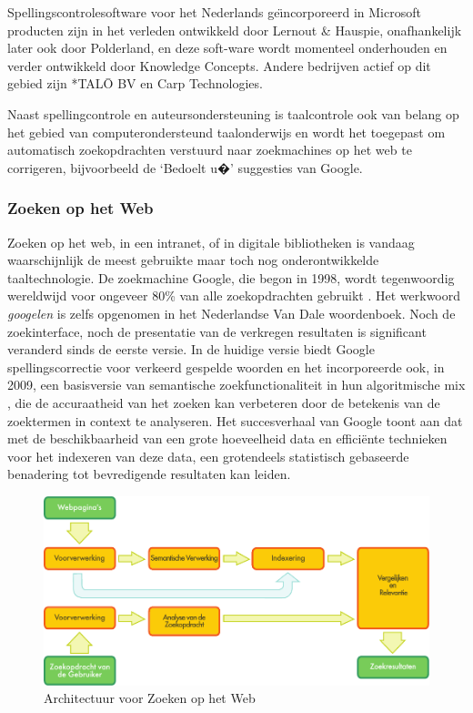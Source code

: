 \documentclass[]{../../metanetpaper}
\begin{document}
\begin{multicols}{2}
    Spellingscontrolesoftware voor het Nederlands ge{\"\i}ncorporeerd in Microsoft producten zijn in het verleden ontwikkeld door Lernout \& Hauspie, onafhankelijk later ook door Polderland, en deze soft-ware wordt momenteel onderhouden en verder ontwikkeld door Knowledge Concepts. Andere bedrijven actief op dit gebied zijn *TAL{\=O} BV en Carp Technologies.

    Naast spellingcontrole en auteursondersteuning is taalcontrole ook van belang op het gebied van computerondersteund taalonderwijs en wordt het toegepast om automatisch zoekopdrachten verstuurd naar zoekmachines op het web te corrigeren, bijvoorbeeld de `Bedoelt u�' suggesties van Google.

\subsubsection{Zoeken op het Web}

 Zoeken op het web, in een intranet, of in digitale bibliotheken is vandaag waarschijnlijk de meest gebruikte maar toch nog onderontwikkelde taaltechnologie. De zoekmachine Google, die begon in 1998, wordt tegenwoordig wereldwijd voor ongeveer 80\% van alle zoekopdrachten gebruikt \cite{Spiegel}. Het werkwoord \emph{googelen} is zelfs opgenomen in het Nederlandse Van Dale woordenboek. Noch de zoekinterface, noch de presentatie van de verkregen resultaten is significant veranderd sinds de eerste versie. In de huidige versie biedt Google spellingscorrectie voor verkeerd gespelde woorden en het incorporeerde ook, in 2009, een basisversie van semantische zoekfunctionaliteit in hun algoritmische mix \cite{GoogleSem}, die de accuraatheid van het zoeken kan verbeteren door de betekenis van de zoektermen in context te analyseren. Het succesverhaal van Google toont aan dat met de beschikbaarheid van een grote hoeveelheid data en effici{\"e}nte technieken voor het indexeren van deze data, een grotendeels statistisch gebaseerde benadering tot bevredigende resultaten kan leiden.

\begin{figure}[tb]
  \center
  \includegraphics[width=\textwidth]{../_media/dutch/web_search_architecture}
  \vspace{-5mm}
  \caption{Architectuur voor Zoeken op het Web}
  \label{fig:websearcharch_de}
\end{figure}


\end{multicols}
\end{document}
